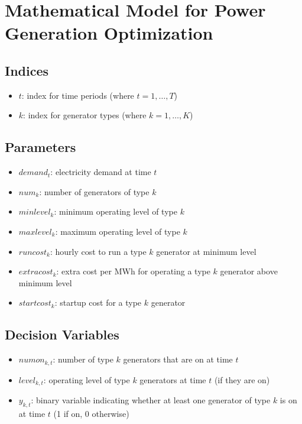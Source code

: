 \documentclass{article}
\begin{document}
\section*{Mathematical Model for Power Generation Optimization}

\subsection*{Indices}
\begin{itemize}
    \item \( t \): index for time periods (where \( t = 1, \ldots, T \))
    \item \( k \): index for generator types (where \( k = 1, \ldots, K \))
\end{itemize}

\subsection*{Parameters}
\begin{itemize}
    \item \( demand_t \): electricity demand at time \( t \)
    \item \( num_k \): number of generators of type \( k \)
    \item \( minlevel_k \): minimum operating level of type \( k \)
    \item \( maxlevel_k \): maximum operating level of type \( k \)
    \item \( runcost_k \): hourly cost to run a type \( k \) generator at minimum level
    \item \( extracost_k \): extra cost per MWh for operating a type \( k \) generator above minimum level
    \item \( startcost_k \): startup cost for a type \( k \) generator
\end{itemize}

\subsection*{Decision Variables}
\begin{itemize}
    \item \( numon_{k,t} \): number of type \( k \) generators that are on at time \( t \)
    \item \( level_{k,t} \): operating level of type \( k \) generators at time \( t \) (if they are on)
    \item \( y_{k,t} \): binary variable indicating whether at least one generator of type \( k \) is on at time \( t \) (1 if on, 0 otherwise)
\end{itemize}
\end{document}
